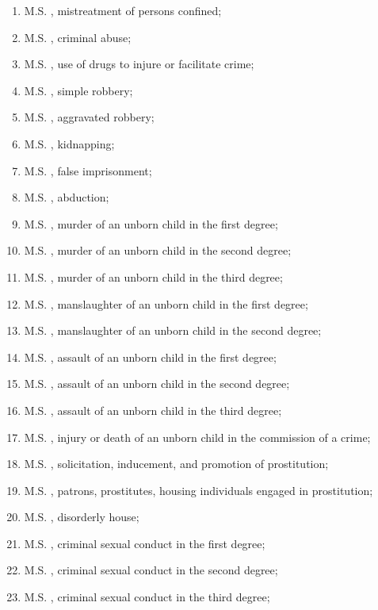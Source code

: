 \begin{enumerate}[{\indent}1)]
    \item M.S. , mistreatment of persons confined;
    \item M.S. , criminal abuse;
    \item M.S. , use of drugs to injure or facilitate crime;
    \item M.S. , simple robbery;
    \item M.S. , aggravated robbery;
    \item M.S. , kidnapping;
    \item M.S. , false imprisonment;
    \item M.S. , abduction;
    \item M.S. , murder of an unborn child in the first degree;
    \item M.S. , murder of an unborn child in the second degree;
    \item M.S. , murder of an unborn child in the third degree;
    \item M.S. , manslaughter of an unborn child in the first degree;
    \item M.S. , manslaughter of an unborn child in the second degree;
    \item M.S. , assault of an unborn child in the first degree;
    \item M.S. , assault of an unborn child in the second degree;
    \item M.S. , assault of an unborn child in the third degree;
    \item M.S. , injury or death of an unborn child in the commission of a crime;
    \item M.S. , solicitation, inducement, and promotion of prostitution;
    \item M.S. , patrons, prostitutes, housing individuals engaged in prostitution;
    \item M.S. , disorderly house;
    \item M.S. , criminal sexual conduct in the first degree;
    \item M.S. , criminal sexual conduct in the second degree;
    \item M.S. , criminal sexual conduct in the third degree;

\end{enumerate}

